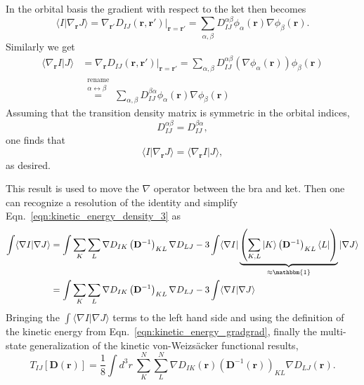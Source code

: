 \documentclass[journal=jacsat,manuscript=article]{achemso}
\newcommand\m[1]{\mathbf{#1}}
\renewcommand\vec[1]{\mathbf{#1}}
\begin{document}
In the orbital basis the gradient with respect to the ket then becomes
\begin{equation}
\langle I \vert \nabla_{\vec{r}} J \rangle = \nabla_{\vec{r}'} D_{IJ}(\vec{r},\vec{r}') \Big\vert_{\vec{r}=\vec{r}'} = \sum_{\alpha,\beta} D_{IJ}^{\alpha\beta} \phi_{\alpha}(\vec{r}) \nabla \phi_{\beta}(\vec{r}).
\end{equation}
Similarly we get
\begin{equation}
\begin{split}
  \langle \nabla_{\vec{r}} I \vert J \rangle &= \nabla_{\vec{r}} D_{IJ}(\vec{r},\vec{r}') \Big\vert_{\vec{r}=\vec{r}'} = \sum_{\alpha,\beta} D_{IJ}^{\alpha\beta} (\nabla \phi_{\alpha}(\vec{r})) \phi_{\beta}(\vec{r}) \\
  & \stackrel{
  \begin{smallmatrix}\textrm{rename}\\ \alpha \leftrightarrow \beta \end{smallmatrix}}{=}
  \sum_{\alpha,\beta} D_{IJ}^{\beta\alpha} \phi_{\alpha}(\vec{r}) \nabla \phi_{\beta}(\vec{r})
\end{split}
\end{equation}
Assuming that the transition density matrix is symmetric in the orbital indices,
\begin{equation}
D_{IJ}^{\alpha\beta} = D_{IJ}^{\beta\alpha},
\end{equation}
one finds that
\begin{equation}
\langle I \vert \nabla_{\vec{r}} J \rangle = \langle \nabla_{\vec{r}} I \vert J \rangle,
\end{equation}
as desired.

This result is used to move the $\nabla$ operator between the bra and ket. Then one can recognize a resolution of the identity and simplify Eqn.~\ref{eqn:kinetic_energy_density_3} as
\begin{equation}
  \begin{split}
    \int \langle \nabla I \vert \nabla J \rangle &=
    \int \sum_K \sum_L \nabla D_{IK} \left(\m{D}^{-1}\right)_{KL} \nabla D_{LJ}
    -3 \int \langle \nabla I \vert \underbrace{
      \left(\sum_{K,L} \vert K \rangle \left(\m{D}^{-1}\right)_{KL} \langle L \vert \right)
    }_{\approx \mathbbm{1}} \vert \nabla J \rangle \\
    &= \int \sum_K \sum_L \nabla D_{IK} \left(\m{D}^{-1}\right)_{KL} \nabla D_{LJ}
    - 3 \int \langle \nabla I \vert \nabla J \rangle
  \end{split}
\end{equation}
Bringing the $\int \langle \nabla I \vert \nabla J \rangle$ terms to the left hand side and using the definition of the kinetic energy from Eqn.~\ref{eqn:kinetic_energy_gradgrad}, finally the multi-state generalization of the kinetic von-Weizs\"{a}cker functional results,
\begin{equation}
T_{IJ}[\m{D}(\vec{r})] = \frac{1}{8} \int d^3\!r ~ \sum_{K}^N \sum_{L}^N \nabla D_{IK}(\vec{r}) \left( \m{D}^{-1}(\vec{r}) \right)_{KL} \nabla D_{LJ}(\vec{r}). \label{eqn:vW_ms_extension}
\end{equation}
\end{document}
